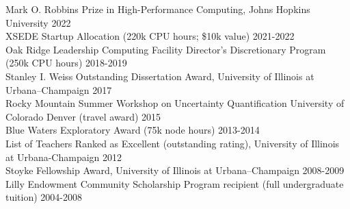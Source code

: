 Mark O. Robbins Prize in High-Performance Computing, Johns Hopkins University \hfill 2022\\
XSEDE Startup Allocation (220k CPU hours; \$10k value) \hfill 2021-2022\\
Oak Ridge Leadership Computing Facility Director's Discretionary Program (250k CPU hours) \hfill{2018-2019}\\
Stanley I. Weiss Outstanding Dissertation Award, University of Illinois at Urbana--Champaign \hfill 2017\\
Rocky Mountain Summer Workshop on Uncertainty Quantification University of Colorado Denver (travel award) \hfill 2015\\
Blue Waters Exploratory Award (75k node hours)  \hfill{2013-2014}\\
List of Teachers Ranked as Excellent (outstanding rating), University of Illinois at Urbana-Champaign \hfill 2012\\
Stoyke Fellowship Award, University of Illinois at Urbana--Champaign \hfill 2008-2009\\
Lilly Endowment Community Scholarship Program recipient (full undergraduate tuition) \hfill 2004-2008
